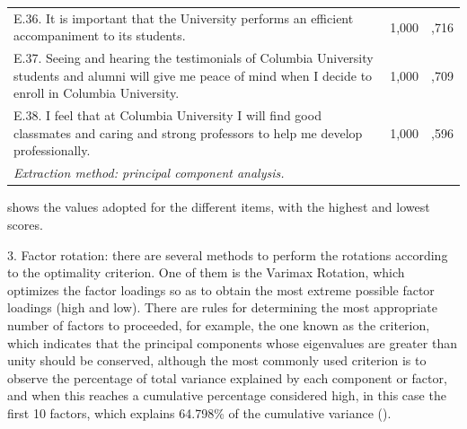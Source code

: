 \documentclass[english]{textolivre}
\begin{document}
\begin{table}[h!]
\begin{tabular}{p{}ll}
E.36. It is important that the University performs an efficient accompaniment to its students. & 1,000 & ,716 \\
E.37. Seeing and hearing the testimonials of Columbia University students and alumni will give me peace of mind when I decide to enroll in Columbia University. & 1,000 & ,709 \\
E.38. I feel that at Columbia University I will find good classmates and caring and strong professors to help me develop professionally. &	1,000 & ,596 \\
\textit{Extraction method: principal component analysis.}\\
\bottomrule
\end{tabular}
\label{Table01}
\end{table}

 shows the values adopted for the different items, with the highest and lowest scores.

3. Factor rotation: there are several methods to perform the rotations according to the optimality criterion. One of them is the Varimax Rotation, which optimizes the factor loadings so as to obtain the most extreme possible factor loadings (high and low). There are rules for determining the most appropriate number of factors to proceeded, for example, the one known as the \textcite{kaiser_index_1974} criterion, which indicates that the principal components whose eigenvalues are greater than unity should be conserved, although the most commonly used criterion is to observe the percentage of total variance explained by each component or factor, and when this reaches a cumulative percentage considered high, in this case the first 10 factors, which explains 64.798\% of the cumulative variance ().
\end{document}
